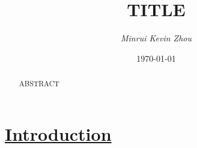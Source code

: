 \documentclass[11pt]{article} %
\newcommand{\hypsection}[1]{\section[#1]{\hyperlink{toc}{#1}}} %
\theoremstyle{theorem}
\theoremstyle{Lthm}
\theoremstyle{Pthm}
\begin{document}
\title{\sc TITLE} %
\author{\it Minrui Kevin Zhou} 
\date{\today}
\maketitle
\thispagestyle{empty}


\begin{abstract}
\noindent
ABSTRACT
\end{abstract}




\hypsection{Introduction}\label{Intro}

















\newpage
\begin{footnotesize} %
\singlespacing %
\setlength{\bibsep}{5pt} %
\thispagestyle{empty} %
\end{footnotesize} %
\end{document}
